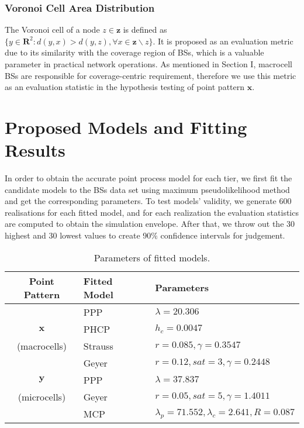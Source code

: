 \documentclass[conference]{IEEEtran}
\begin{document}
\subsubsection{\bf{Voronoi Cell Area Distribution}}
The Voronoi cell of a node $z\in\mathbf{z}$ is defined as $\{y\in\mathbf{R}^2:d(y,x)>d(y,z),\forall x\in\mathbf{z}\backslash z\}$. It is proposed as an evaluation metric due to its similarity with the coverage region of BSs\cite{taylor2012pairwise}, which is a valuable parameter in practical network operations. As mentioned in Section I, macrocell BSs are responsible for coverage-centric requirement, therefore we use this metric as an evaluation statistic in the hypothesis testing of point pattern $\mathbf{x}$.

\section{Proposed Models and Fitting Results}
In order to obtain the accurate point process model for each tier, we first fit the candidate models to the BSs data set using maximum pseudolikelihood method and get the corresponding parameters. To test models' validity, we generate 600 realisations for each fitted model, and for each realization the evaluation statistics are computed to obtain the simulation envelope. After that, we throw out the 30 highest and 30 lowest values to create 90$\%$ confidence intervals for judgement.

\begin{table}[h]
\centering
\caption{Parameters of fitted models.}
\begin{tabular}{cll}
\hline
Point Pattern & Fitted Model & Parameters \\
\hline
                              &   PPP   & $\lambda=20.306$            \\
       $\mathbf{x}$           &  PHCP   & $h_c=0.0047$       \\
        (macrocells)          & Strauss & $r=0.085, \gamma=0.3547$         \\
                              &  Geyer  & $r=0.12, sat=3, \gamma=0.2448$  \\
\hline
       $\mathbf{y}$           &   PPP   & $\lambda=37.837$             \\
        (microcells)          &  Geyer  & $r=0.05, sat=5, \gamma=1.4011$ \\
                              &   MCP   & $\lambda_p=71.552, \lambda_c=2.641, R=0.087$ \\
\hline
\end{tabular}
\end{table}
\end{document}
